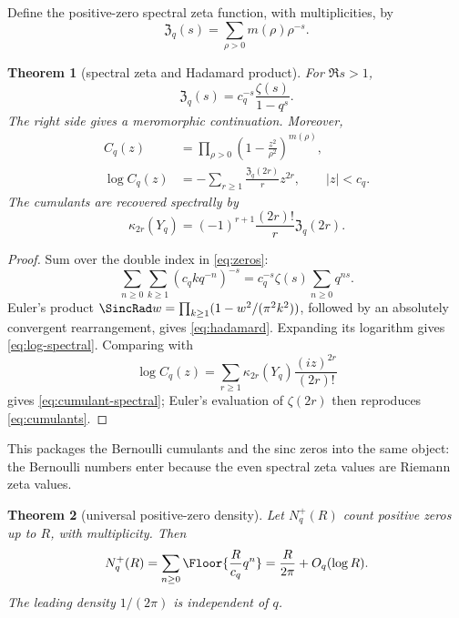 \documentclass[11pt,oneside]{article}
\newtheorem{theorem}{Theorem}[section]
\theoremstyle{definition}
\theoremstyle{remark}
\begin{document}
Define the positive-zero spectral zeta function, with multiplicities, by
\begin{equation}\label{eq:spectral-zeta-def}
 \mathfrak Z_q(s)=\sum_{\rho>0}m(\rho)\rho^{-s}.
\end{equation}

\begin{theorem}[spectral zeta and Hadamard product]\label{thm:spectral-zeta}
For $\Re s>1$,
\begin{equation}\label{eq:spectral-zeta}
 \boxed{\quad
 \mathfrak Z_q(s)=c_q^{-s}\frac{\zeta(s)}{1-q^s}.
 \quad}
\end{equation}
The right side gives a meromorphic continuation.  Moreover,
\begin{align}
 C_q(z)&=\prod_{\rho>0}\left(1-\frac{z^2}{\rho^2}\right)^{m(\rho)},
 \label{eq:hadamard}\\
 \log C_q(z)&=-\sum_{r\ge1}\frac{\mathfrak Z_q(2r)}{r}z^{2r},
 \qquad |z|<c_q.
 \label{eq:log-spectral}
\end{align}
The cumulants are recovered spectrally by
\begin{equation}\label{eq:cumulant-spectral}
 \kappa_{2r}(Y_q)=(-1)^{r+1}\frac{(2r)!}{r}\mathfrak Z_q(2r).
\end{equation}
\end{theorem}

\begin{proof}
Sum over the double index in \cref{eq:zeros}:
\[
 \sum_{n\ge0}\sum_{k\ge1}(c_qkq^{-n})^{-s}
 =c_q^{-s}\zeta(s)\sum_{n\ge0}q^{ns}.
\]
Euler's product $\SincRad w=\prod_{k\ge1}(1-w^2/(\pi^2k^2))$, followed by an absolutely convergent rearrangement, gives \cref{eq:hadamard}.  Expanding its logarithm gives \cref{eq:log-spectral}.  Comparing with
\[
 \log C_q(z)=\sum_{r\ge1}\kappa_{2r}(Y_q)\frac{(iz)^{2r}}{(2r)!}
\]
gives \cref{eq:cumulant-spectral}; Euler's evaluation of $\zeta(2r)$ then reproduces \cref{eq:cumulants}.
\end{proof}

This packages the Bernoulli cumulants and the sinc zeros into the same object: the Bernoulli numbers enter because the even spectral zeta values are Riemann zeta values.

\begin{theorem}[universal positive-zero density]\label{thm:zero-count-general}
Let $N_q^+(R)$ count positive zeros up to $R$, with multiplicity.  Then
\begin{equation}\label{eq:zero-count-floor}
 N_q^+(R)=\sum_{n\ge0}\Floor{\frac{R}{c_q}q^n}
 =\frac{R}{2\pi}+O_q(\log R).
\end{equation}
The leading density $1/(2\pi)$ is independent of $q$.
\end{theorem}
\end{document}
